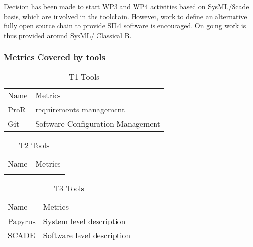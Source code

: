 \documentclass{template/openetcs_article}
\begin{document}
Decision has been made to start WP3 and WP4 activities based on SysML/Scade basis, which are involved in the toolchain. However, work to define an alternative fully open source chain to provide SIL4 software is encouraged. On going work is thus provided around SysML/ Classical B.

\subsubsection{Metrics Covered by tools}

\begin{table}[H]
\begin{tabular}{|m{3cm}|m{10cm}|}
\hline
\rowcolor{myblue}
\multicolumn{2}{|c|}{T1 Tools} \\\hline
\rowcolor{lightgray}
Name &
Metrics 
\\\hline
ProR & requirements management\\\hline
Git & Software Configuration Management\\\hline
\end{tabular}
\caption{T1 Tools}
\end{table}

\begin{table}[H]
\begin{tabular}{|m{3cm}|m{10cm}|}
\hline
\rowcolor{myblue}
\multicolumn{2}{|c|}{T2 Tools} \\\hline
\rowcolor{lightgray}
Name &
Metrics 
\\\hline
 & \\\hline
\end{tabular}
\caption{T2 Tools}
\end{table}

\begin{table}[H]
\begin{tabular}{|m{3cm}|m{10cm}|}
\hline
\rowcolor{myblue}
\multicolumn{2}{|c|}{T3 Tools} \\\hline
\rowcolor{lightgray}
Name &
Metrics 
\\\hline
Papyrus & System level description\\\hline
SCADE & Software level description\\\hline

\end{tabular}
\caption{T3 Tools}
\end{table}

\end{document}

